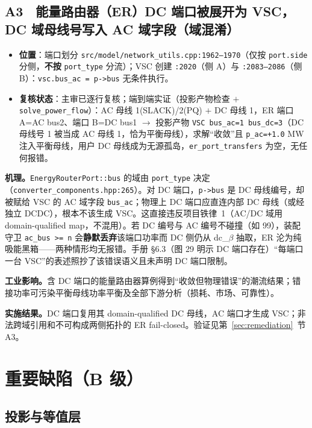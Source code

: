 \documentclass[11pt,a4paper,fontset=fandol]{ctexart}
\newcommand{\file}[1]{\texttt{#1}}
\begin{document}
\subsection{A3　能量路由器（ER）DC 端口被展开为 VSC，DC 域母线号写入 AC 域字段（域混淆）}
\label{sec:a3}

\begin{itemize}
  \item \textbf{位置}：端口划分 \file{src/model/network\_utils.cpp:1962--1970}（仅按 \texttt{port.side} 分侧，\textbf{不按} \texttt{port\_type} 分流）；VSC 创建 \file{:2020}（侧 A）与 \file{:2083--2086}（侧 B）：\texttt{vsc.bus\_ac = p->bus} 无条件执行。
  \item \textbf{复核状态}：主审已逐行复核；端到端实证（投影产物检查 $+$ \file{solve\_power\_flow}）：AC 母线 1(SLACK)/2(PQ) $+$ DC 母线 1，ER 端口 A=AC bus2、端口 B=DC bus1 $\to$ 投影产物 \texttt{VSC bus\_ac=1 bus\_dc=3}（DC 母线号 1 被当成 AC 母线 1，恰为平衡母线），求解``收敛''且 \texttt{p\_ac=+1.0} MW 注入平衡母线，用户 DC 母线成为无源孤岛，\texttt{er\_port\_transfers} 为空，无任何报错。
\end{itemize}

\textbf{机理。}\texttt{EnergyRouterPort::bus} 的域由 \texttt{port\_type} 决定（\file{converter\_components.hpp:265}）。对 DC 端口，\texttt{p->bus} 是 DC 母线编号，却被赋给 VSC 的 AC 域字段 \texttt{bus\_ac}；物理上 DC 端口应直连内部 DC 母线（或经独立 DCDC），根本不该生成 VSC。这直接违反项目铁律~1（AC/DC 域用 domain-qualified map，不混用）。若 DC 编号与 AC 编号不碰撞（如 99），装配守卫 \texttt{ac\_bus >= n} 会\textbf{静默丢弃}该端口功率而 DC 侧仍从 dc\_$\beta$ 抽取，ER 沦为纯吸能黑箱——两种情形均无报错。手册 \S 6.3（图 29 明示 DC 端口存在）``每端口一台 VSC''的表述照抄了该错误语义且未声明 DC 端口限制。

\textbf{工业影响。}含 DC 端口的能量路由器算例得到``收敛但物理错误''的潮流结果；错接功率可污染平衡母线功率平衡及全部下游分析（损耗、市场、可靠性）。

\textbf{实施结果。}DC 端口复用其 domain-qualified DC 母线，AC 端口才生成 VSC；非法跨域引用和不可构成两侧拓扑的 ER fail-closed。验证见第~\ref{sec:remediation}~节 A3。

\newpage
\section{重要缺陷（B 级）}
\label{sec:major}

\subsection{投影与等值层}
\end{document}
